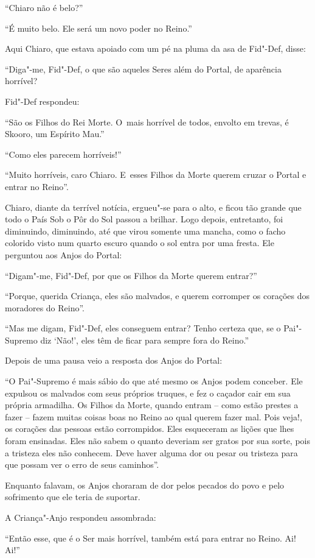 ``Chiaro não é belo?''

``É muito belo. Ele será um novo poder no Reino.''

Aqui Chiaro, que estava apoiado com um pé na pluma da asa de Fid"-Def,
disse:

``Diga"-me, Fid"-Def, o que são aqueles Seres além do Portal, de aparência
horrível?

Fid"-Def respondeu:

``São os Filhos do Rei Morte. O~mais horrível de todos, envolto em
trevas, é Skooro, um Espírito Mau.''

``Como eles parecem horríveis!''

``Muito horríveis, caro Chiaro. E~esses Filhos da Morte querem cruzar o
Portal e entrar no Reino''.

Chiaro, diante da terrível notícia, ergueu"-se para o alto, e ficou tão
grande que todo o País Sob o Pôr do Sol passou a brilhar. Logo depois,
entretanto, foi diminuindo, diminuindo, até que virou somente uma
mancha, como o facho colorido visto num quarto escuro quando o sol entra
por uma fresta. Ele perguntou aos Anjos do Portal:

``Digam"-me, Fid"-Def, por que os Filhos da Morte querem entrar?''

``Porque, querida Criança, eles são malvados, e querem corromper os
corações dos moradores do Reino''.

``Mas me digam, Fid"-Def, eles conseguem entrar? Tenho certeza que, se o
Pai"-Supremo diz `Não!', eles têm de ficar para sempre fora do Reino.''

Depois de uma pausa veio a resposta dos Anjos do Portal:

``O Pai"-Supremo é mais sábio do que até mesmo os Anjos podem conceber.
Ele expulsou os malvados com seus próprios truques, e fez o caçador cair
em sua própria armadilha. Os Filhos da Morte, quando entram -- como
estão prestes a fazer -- fazem muitas coisas boas no Reino ao qual
querem fazer mal. Pois veja!, os corações das pessoas estão corrompidos.
Eles esqueceram as lições que lhes foram ensinadas. Eles não sabem o
quanto deveriam ser gratos por sua sorte, pois a tristeza eles não
conhecem. Deve haver alguma dor ou pesar ou tristeza para que possam ver
o erro de seus caminhos''.

Enquanto falavam, os Anjos choraram de dor pelos pecados do povo e pelo
sofrimento que ele teria de suportar.

A Criança"-Anjo respondeu assombrada:

``Então esse, que é o Ser mais horrível, também está para entrar no
Reino. Ai! Ai!''

